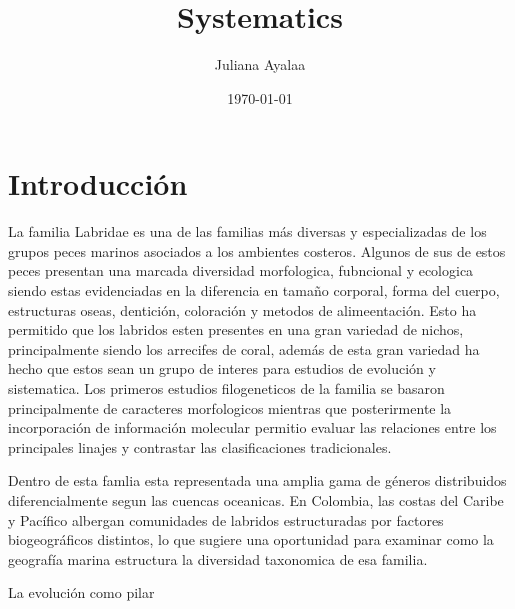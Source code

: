 \documentclass[12pt]{article}
\title{Systematics}
\author{Juliana Ayalaa}
\date{\today}
\begin{document}
\maketitle

\section{Introducción}
La familia Labridae es una de las familias más diversas y especializadas de los grupos peces marinos asociados a los ambientes costeros. Algunos de sus de estos peces presentan una marcada diversidad morfologica, fubncional y ecologica siendo estas evidenciadas en la diferencia en tamaño corporal, forma del cuerpo, estructuras oseas, dentición, coloración y metodos de alimeentación. Esto ha permitido que los labridos esten presentes en una gran variedad de nichos, principalmente siendo los arrecifes de coral, además de esta gran variedad ha hecho que estos sean un grupo de interes para estudios de evolución y sistematica. Los primeros estudios filogeneticos de la familia se basaron principalmente de caracteres morfologicos mientras que posterirmente la incorporación de información molecular permitio evaluar las relaciones entre los principales linajes y contrastar las clasificaciones tradicionales.

Dentro de esta famlia esta representada una amplia gama de géneros distribuidos diferencialmente segun las cuencas oceanicas. En Colombia, las costas del Caribe y Pacífico albergan comunidades de labridos estructuradas por factores biogeográficos distintos, lo que sugiere una oportunidad para examinar como la geografía marina estructura la diversidad taxonomica de esa familia.

La evolución como pilar
\end{document}
